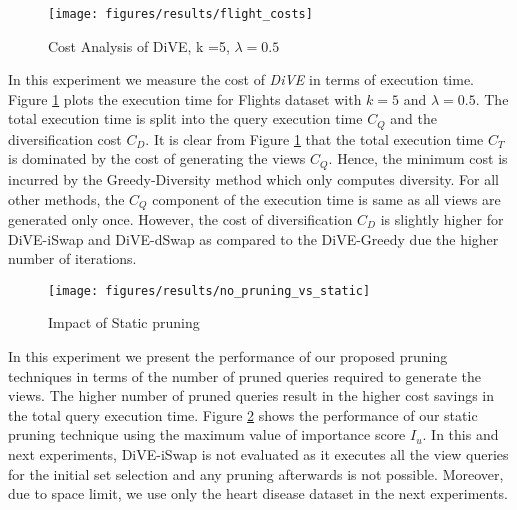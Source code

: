 \begin{figure}[t]
	\texttt{[image: figures/results/flight\_costs]}
		\vspace{-15pt}
	\caption{Cost Analysis of DiVE, k =5, $\lambda = 0.5$}
	\label{fig:cost_flights}
		\vspace{-5pt}
\end{figure}


{}
In this experiment we measure the cost of {\em DiVE} in terms of execution time. Figure \ref{fig:cost_flights} plots the execution time for Flights dataset with $k = 5$ and $\lambda = 0.5$. The total execution time is split into the query execution time $C_Q$ and the diversification cost $C_D$. It is clear from Figure \ref{fig:cost_flights} that the total execution time $C_T$ is dominated by the cost of generating the views $C_Q$. Hence, the minimum cost is incurred by the Greedy-Diversity method which only computes diversity. For all other methods, the $C_Q$ component of the execution time is same as all views are generated only once. However, the cost of diversification $C_D$ is slightly higher for DiVE-iSwap and DiVE-dSwap as compared to the DiVE-Greedy due the higher number of iterations. 







%

\begin{figure}[t]
	\texttt{[image: figures/results/no\_pruning\_vs\_static]}
			\vspace{-15pt}
	\caption{Impact of Static pruning}%
	\label{fig:impact_lambda_to_PI_sampling_greedy_pruning}
		\vspace{-6pt}
\end{figure}


{}
In this experiment we present the performance of our proposed pruning techniques in terms of the number of pruned queries required to generate the views. The higher number of pruned queries result in the higher cost savings in the total query execution time. Figure \ref{fig:impact_lambda_to_PI_sampling_greedy_pruning} shows the performance of our static pruning technique using the maximum value of importance score $I_u$. In this and next experiments, DiVE-iSwap is not evaluated as it executes all the view queries for the initial set selection and any pruning afterwards is not possible. Moreover, due to space limit, we use only the heart disease dataset in the next experiments.

